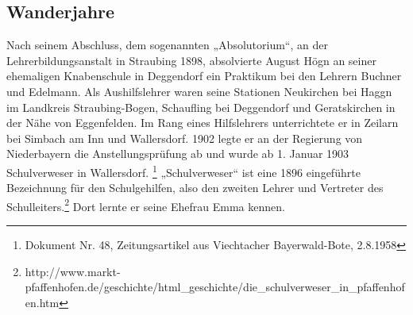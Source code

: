 \subsection{Wanderjahre}

\hypertarget{RefHeadingToc100333728}{}Nach seinem Abschluss, dem
sogenannten „Absolutorium“, an der Lehrerbildungsanstalt in Straubing
1898, absolvierte August Högn an seiner ehemaligen Knabenschule in
Deggendorf ein Praktikum bei den Lehrern Buchner und Edelmann. Als
Aushilfslehrer waren seine Stationen Neukirchen bei Haggn im Landkreis
Straubing-Bogen, Schaufling bei Deggendorf und Geratskirchen in der
Nähe von Eggenfelden. Im Rang eines Hilfslehrers unterrichtete er in
Zeilarn bei Simbach am Inn und Wallersdorf. 1902 legte er an der
Regierung von Niederbayern die Anstellungsprüfung ab und wurde ab 1.
Januar 1903 Schulverweser in Wallersdorf. \footnote{Dokument Nr. 48,
Zeitungsartikel aus Viechtacher Bayerwald-Bote, 2.8.1958}
„Schulverweser“ ist eine 1896 eingeführte Bezeichnung für den
Schulgehilfen, also den zweiten Lehrer und Vertreter des
Schulleiters.\footnote{
http://www.markt-pfaffenhofen.de/geschichte/html\_geschichte/die\_schulverweser\_in\_pfaffenhofen.htm}
Dort lernte er seine Ehefrau Emma kennen.

